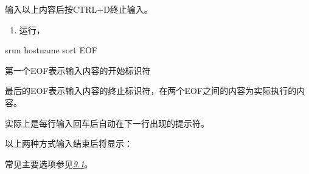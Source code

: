 \documentclass[a4paper,12pt,english]{sphinxmanual}
\begin{document}
\sphinxAtStartPar
输入以上内容后按CTRL+D终止输入。
\begin{enumerate}
%
\item {} 
\sphinxAtStartPar
运行，

\end{enumerate}

\begin{sphinxVerbatim}[commandchars=\\\{\}]
\PYGZgt{} 
\PYGZgt{} srun hostname  sort
\PYGZgt{} EOF

  \PYGZhy{}  第一个EOF表示输入内容的开始标识符

  \PYGZhy{}  最后的EOF表示输入内容的终止标识符，在两个EOF之间的内容为实际执行的内容。

  \PYGZhy{}  \PYGZgt{}实际上是每行输入回车后自动在下一行出现的提示符。
\end{sphinxVerbatim}

\sphinxAtStartPar
以上两种方式输入结束后将显示：

\begin{sphinxVerbatim}[commandchars=\\\{\}]
    
\end{sphinxVerbatim}

\sphinxAtStartPar
常见主要选项参见{\hyperref[\detokenize{slurm/slurm:slurmoption}]{\emph{9.1}}}。
\end{document}
